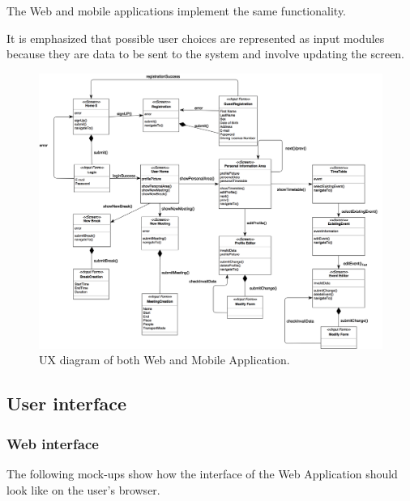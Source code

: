 \documentclass{article}
\begin{document}
 	\bigskip
	The Web and mobile applications implement the same functionality.
 	
 	\bigskip
	It is emphasized that possible user choices are represented as input modules because they are data to be sent to the system and involve updating the screen.

	\begin{figure}[!ht]
	\centering
	\includegraphics[width=\textwidth]{img/diagrams/ux.png}
	\caption{UX diagram of both Web and Mobile Application.}
	\end{figure}

	\subsection{User interface}
	\subsubsection{Web interface}
	The following mock-ups show how the interface of the Web Application should look like on the user’s browser.
\end{document}
